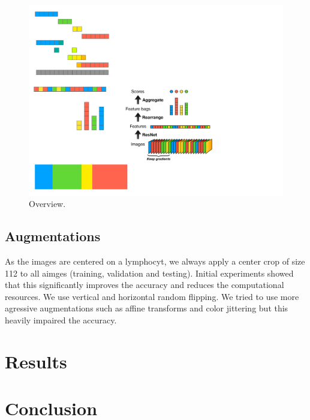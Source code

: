 \documentclass[final]{cvpr}
\begin{document}
\begin{figure}[t]
	\begin{center}
		\includegraphics[width=0.9\linewidth]{graphic.pdf}
	\end{center}
	\caption{Overview.}
	\label{fig:overview}
\end{figure}

\subsection{Augmentations}
As the images are centered on a lymphocyt, we always apply a center crop of size 112 to all aimges (training, validation and testing). Initial experiments showed that this significantly improves the accuracy and reduces the computational resources. We use vertical and horizontal random flipping. We tried to use more agressive augmentations such as affine transforms and color jittering but this heavily impaired the accuracy.
	
	\section{Results}
	
	\section{Conclusion}
	
	
	{\small
		
		
	}
\end{document}

